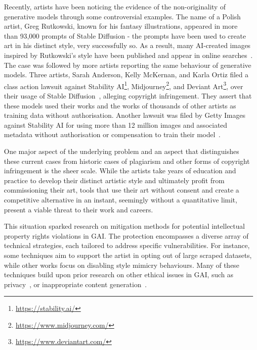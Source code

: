 \documentclass[conference,table]{IEEEtran}
\begin{document}
Recently, artists have been noticing the evidence of the non-originality of generative models through some controversial examples. 
The name of a Polish artist, Greg Rutkowski, known for his fantasy illustrations, appeared in more than 93,000 prompts of Stable Diffusion - the prompts have been used to create art in his distinct style, very successfully so. 
As a result, many AI-created images inspired by Rutkowski's style have been published and appear in online searches~\cite{mit_technology_review_this_2022}. The case was followed by more artists reporting the same behaviour of generative models. 
Three artists, Sarah Anderson, Kelly McKernan, and Karla Ortiz filed a class action lawsuit against Stability AI\footnote{\url{https://stability.ai/}}, Midjourney\footnote{\url{https://www.midjourney.com/}}, and Deviant Art\footnote{\url{https://www.deviantart.com/}}, over their usage of Stable Diffusion~\cite{rombach_high-resolution_2022}, alleging copyright infringement. They assert that these models used their works and the works of thousands of other artists as training data without authorisation.
Another lawsuit was filed by Getty Images against Stability AI for using more than 12 million images and associated metadata without authorisation or compensation to train their model~\cite{nolan_ai_2023}.

One major aspect of the underlying problem and an aspect that distinguishes these current cases from historic cases of plagiarism and other forms of copyright infringement is the sheer scale.
While the artists take years of education and practice to develop their distinct artistic style and ultimately profit from commissioning their art, tools that use their art without consent and create a competitive alternative in an instant, seemingly without a quantitative limit, present a viable threat to their work and careers.

This situation sparked research on mitigation methods for potential intellectual property rights violations in GAI. 
The protection encompasses a diverse array of technical strategies, each tailored to address specific vulnerabilities.
For instance, some techniques aim to support the artist in opting out of large scraped datasets, while other works focus on disabling style mimicry behaviours. 
Many of these techniques build upon prior research on other ethical issues in GAI, such as privacy~\cite{matsumoto_membership_2023}, or inappropriate content generation~\cite{gandikota_erasing_2023}.
\end{document}
